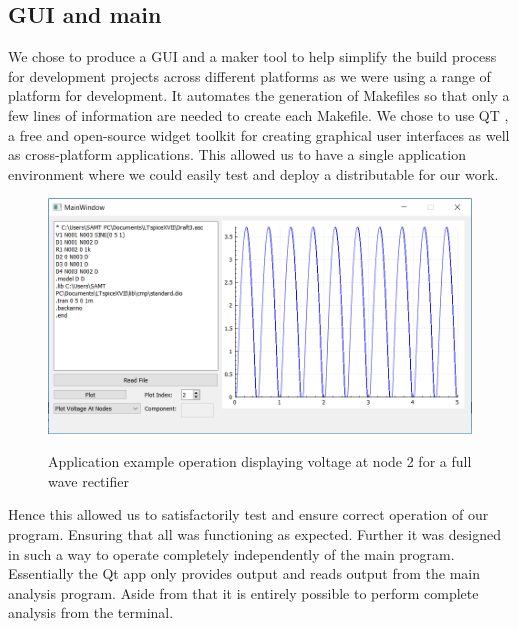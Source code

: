 \documentclass{article}
\begin{document}
\subsection{GUI and main}
We chose to produce a GUI and a maker tool to help simplify the build process for development projects across different platforms as we were using a range of platform for development. It automates the generation of Makefiles so that only a few lines of information are needed to create each Makefile. We chose to use QT , a free and open-source widget toolkit for creating graphical user interfaces as well as cross-platform applications. This allowed us to have a single application environment where we could easily test and deploy a distributable for our work.
\bigbreak
\begin{figure}[h]
    \caption{Application example operation displaying voltage at node 2 for a full wave rectifier}
    \centering
    \includegraphics[width=1\textwidth]{images/AppEx.PNG}
    \label{fig:AppEx}
\end{figure}
Hence this allowed us to satisfactorily test and ensure correct operation of our program. Ensuring that all was functioning as expected. Further it was designed in such a way to operate completely independently of the main program. Essentially the Qt app only provides output and reads output from the main analysis program. Aside from that it is entirely possible to perform complete analysis from the terminal.


\newpage
\end{document}
